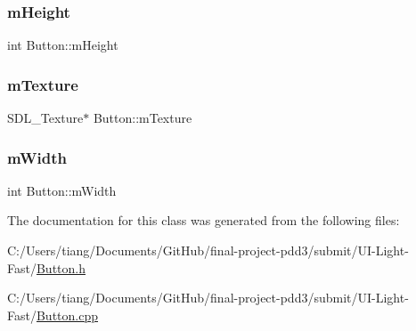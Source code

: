 \subsubsection{\texorpdfstring{m\+Height}{mHeight}}
{\footnotesize\ttfamily int Button\+::m\+Height\hspace{0.3cm}{\ttfamily [private]}}

\mbox{\label{class_button_ac5e57d9ffee5d8bae504d008562c1951}} 
\subsubsection{\texorpdfstring{m\+Texture}{mTexture}}
{\footnotesize\ttfamily S\+D\+L\+\_\+\+Texture$\ast$ Button\+::m\+Texture\hspace{0.3cm}{\ttfamily [private]}}

\mbox{\label{class_button_a64b130b0efe8346077d12856bd2b1a93}} 
\subsubsection{\texorpdfstring{m\+Width}{mWidth}}
{\footnotesize\ttfamily int Button\+::m\+Width\hspace{0.3cm}{\ttfamily [private]}}



The documentation for this class was generated from the following files\+:\begin{DoxyCompactItemize}
\item 
C\+:/\+Users/tiang/\+Documents/\+Git\+Hub/final-\/project-\/pdd3/submit/\+U\+I-\/\+Light-\/\+Fast/\mbox{\hyperlink{_button_8h}{Button.\+h}}\item 
C\+:/\+Users/tiang/\+Documents/\+Git\+Hub/final-\/project-\/pdd3/submit/\+U\+I-\/\+Light-\/\+Fast/\mbox{\hyperlink{_button_8cpp}{Button.\+cpp}}\end{DoxyCompactItemize}
